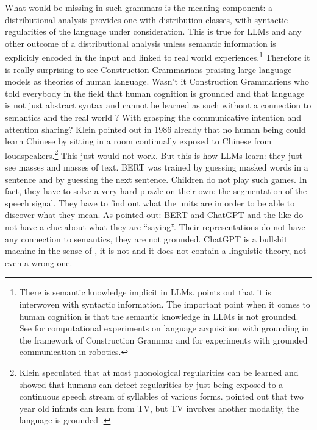 What would be missing in such grammars is the meaning component: a distributional analysis provides
one with distribution classes, with syntactic regularities of the language under consideration. This
is true for LLMs and any other outcome of a distributional analysis unless semantic information is
explicitly encoded in the input and linked to real world experiences.\footnote{%
  There is semantic knowledge implicit in LLMs. \citet[358]{Piantadosi2024a} points out that it is
  interwoven with syntactic information. The important point when it comes to human cognition is
  that the semantic knowledge in LLMs is not grounded. See \citet{CM2001a} for computational experiments on language
  acquisition with grounding in the framework of Construction Grammar and \citet{Steels2003a} for
  experiments with grounded communication in robotics.%
}
Therefore it is really surprising to see Construction Grammarians
praising large language models as theories of human language. Wasn't it Construction Grammariens who
told everybody in the field that human cognition is grounded
\citep{Barsalou2008a} and that language is not just abstract
syntax and cannot be learned as such without a connection to semantics and the real world
\parencites[44]{Klein86a-u}[113]{Tomasello2003a}[Section~4.2.3, 4.2.8]{AL2011a-u}? With grasping the communicative
intention and attention sharing? Klein pointed out in 1986 already that no human being could learn
Chinese by sitting in a room continually exposed to Chinese from loudspeakers.\footnote{%
Klein speculated that at most phonological regularities can be learned and \citet{NHSA2004a} showed
that humans can detect regularities by just being exposed to a continuous speech stream
of syllables of various forms. \citet[44]{Sogaard2023a} pointed out that two year old infants can learn
from TV, but TV involves another modality, the language is grounded \citep{Rice1983a}.
} This just would not work. But this is how LLMs learn: they just see masses and masses of
text. BERT was trained by guessing masked words in a sentence and by guessing the next
sentence. Children do not play such games. In fact, they have to solve a very hard puzzle on their own:
the segmentation of the speech signal. They have to find out what the units are in order to be able
to discover what they mean. As \citet{BK2020a} pointed
out: BERT and ChatGPT and the like do not have a clue about what they are ``saying''. Their representations do not have any
connection to semantics, they are not grounded. ChatGPT is a bullshit machine in the sense of
\citet{HicksHumphriesSlater2024a}, it is not and it does not contain a linguistic theory, not even a
wrong one.
%


